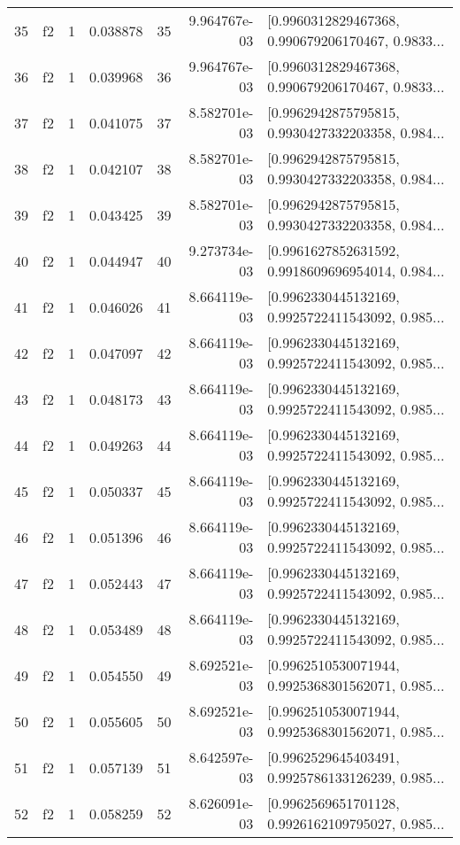 \begin{tabular}{lllrlrl}
35  &  f2 &   1 &  0.038878 &   35 &  9.964767e-03 &  [0.9960312829467368, 0.990679206170467, 0.9833... \\
36  &  f2 &   1 &  0.039968 &   36 &  9.964767e-03 &  [0.9960312829467368, 0.990679206170467, 0.9833... \\
37  &  f2 &   1 &  0.041075 &   37 &  8.582701e-03 &  [0.9962942875795815, 0.9930427332203358, 0.984... \\
38  &  f2 &   1 &  0.042107 &   38 &  8.582701e-03 &  [0.9962942875795815, 0.9930427332203358, 0.984... \\
39  &  f2 &   1 &  0.043425 &   39 &  8.582701e-03 &  [0.9962942875795815, 0.9930427332203358, 0.984... \\
40  &  f2 &   1 &  0.044947 &   40 &  9.273734e-03 &  [0.9961627852631592, 0.9918609696954014, 0.984... \\
41  &  f2 &   1 &  0.046026 &   41 &  8.664119e-03 &  [0.9962330445132169, 0.9925722411543092, 0.985... \\
42  &  f2 &   1 &  0.047097 &   42 &  8.664119e-03 &  [0.9962330445132169, 0.9925722411543092, 0.985... \\
43  &  f2 &   1 &  0.048173 &   43 &  8.664119e-03 &  [0.9962330445132169, 0.9925722411543092, 0.985... \\
44  &  f2 &   1 &  0.049263 &   44 &  8.664119e-03 &  [0.9962330445132169, 0.9925722411543092, 0.985... \\
45  &  f2 &   1 &  0.050337 &   45 &  8.664119e-03 &  [0.9962330445132169, 0.9925722411543092, 0.985... \\
46  &  f2 &   1 &  0.051396 &   46 &  8.664119e-03 &  [0.9962330445132169, 0.9925722411543092, 0.985... \\
47  &  f2 &   1 &  0.052443 &   47 &  8.664119e-03 &  [0.9962330445132169, 0.9925722411543092, 0.985... \\
48  &  f2 &   1 &  0.053489 &   48 &  8.664119e-03 &  [0.9962330445132169, 0.9925722411543092, 0.985... \\
49  &  f2 &   1 &  0.054550 &   49 &  8.692521e-03 &  [0.9962510530071944, 0.9925368301562071, 0.985... \\
50  &  f2 &   1 &  0.055605 &   50 &  8.692521e-03 &  [0.9962510530071944, 0.9925368301562071, 0.985... \\
51  &  f2 &   1 &  0.057139 &   51 &  8.642597e-03 &  [0.9962529645403491, 0.9925786133126239, 0.985... \\
52  &  f2 &   1 &  0.058259 &   52 &  8.626091e-03 &  [0.9962569651701128, 0.9926162109795027, 0.985... \\

\end{tabular}
